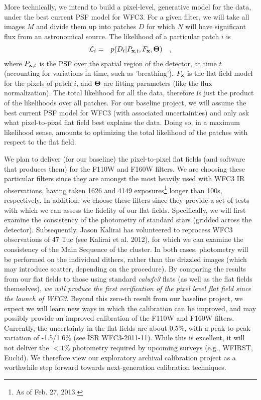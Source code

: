 \documentclass[12pt]{article}
\begin{document}
More technically, we intend to build a pixel-level, generative model
for the data, under the best current PSF model for WFC3.  For a given
filter, we will take all images $M$ and divide them up into patches $D$
for which $N$ will have significant flux from an astronomical source.
The likelihood of a particular patch $i$ is 
\begin{eqnarray}
\mathcal{L}_i & = & p(D_i|P_{{\bf x},t},F_{{\bf x}},{\bf \Theta})
\quad ,
\end{eqnarray}
where $P_{{\bf x},t}$ is the PSF over the spatial region of the
detector, at time $t$ (accounting for variations in time, such as
'breathing').  $F_{{\bf x}}$ is the flat field model for the pixels of
patch $i$, and ${\bf \Theta}$ are fitting parameters (like the flux
normalization).  The total likelihood
for all the data, therefore is just the product of the likelihoods
over all patches.  For our baseline project, we will assume the best
current PSF model for WFC3 (with associated uncertainties) and only
ask what pixel-to-pixel flat field best explains the data.  Doing so,
in a maximum likelihood sense, amounts to optimizing the total
likelihood of the patches with respect to the flat field.

We plan to deliver (for our baseline) the pixel-to-pixel flat
fields (and software that produces them) for the F110W and F160W
filters.  We are choosing these particular filters since they are
amongst the most heavily used with WFC3 IR observations, having taken
1626 and 4149 exposures\footnote{As of Feb. 27, 2013.} longer than
100s, respectively.  In addition, we choose these filters
since they provide a set of tests with which we can assess the
fidelity of our flat fields.  Specifically, we will first examine the
consistency of the photometry of standard stars (gridded across 
the detector).  Subsequently, Jason Kalirai has volunteered to
reprocess WFC3 observations of 47 Tuc (see Kalirai et al. 2012), for
which we can examine the consistency of the Main Sequence of the
cluster.  In both cases, photometry will be performed on the
individual dithers, rather than the drizzled images (which may
introduce scatter, depending on the procedure).  By comparing the
results from our flat fields to those using standard \emph{calwfc3}
flats (as well as the flat fields themselves), \emph{we will produce
  the first verification of the pixel level flat field since the
  launch of WFC3}.  Beyond this zero-th result from our baseline
project, we expect we will learn new ways in which the calibration can
be improved, and may possibly provide an improved calibration of the
F110W and F160W filters.  Currently, the uncertainty in the flat
fields are about $0.5\%$, with a peak-to-peak variation of -1.5/1.6\%
(see ISR WFC3-2011-11).  While this is excellent, it will not deliver
the $<1\%$ photometry required by upcoming surveys (e.g., WFIRST,
Euclid).  We therefore view our exploratory archival calibration
project as a worthwhile step forward towards next-generation
calibration techniques.
\end{document}
